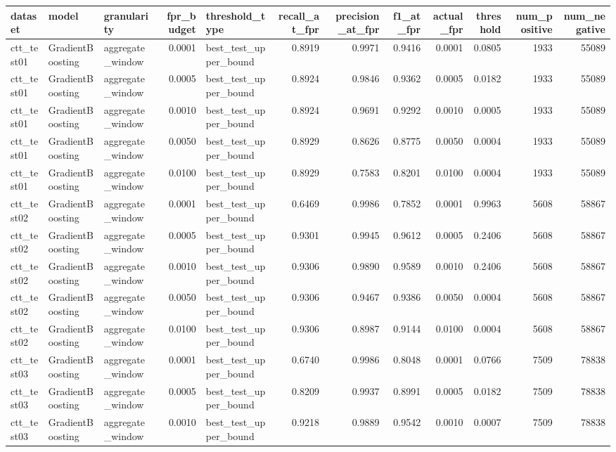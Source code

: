 \begin{tabular}{lllrlrrrrrrr}
\toprule
dataset & model & granularity & fpr\_budget & threshold\_type & recall\_at\_fpr & precision\_at\_fpr & f1\_at\_fpr & actual\_fpr & threshold & num\_positive & num\_negative \\
\midrule
ctt\_test01 & GradientBoosting & aggregate\_window & 0.0001 & best\_test\_upper\_bound & 0.8919 & 0.9971 & 0.9416 & 0.0001 & 0.0805 & 1933 & 55089 \\
ctt\_test01 & GradientBoosting & aggregate\_window & 0.0005 & best\_test\_upper\_bound & 0.8924 & 0.9846 & 0.9362 & 0.0005 & 0.0182 & 1933 & 55089 \\
ctt\_test01 & GradientBoosting & aggregate\_window & 0.0010 & best\_test\_upper\_bound & 0.8924 & 0.9691 & 0.9292 & 0.0010 & 0.0005 & 1933 & 55089 \\
ctt\_test01 & GradientBoosting & aggregate\_window & 0.0050 & best\_test\_upper\_bound & 0.8929 & 0.8626 & 0.8775 & 0.0050 & 0.0004 & 1933 & 55089 \\
ctt\_test01 & GradientBoosting & aggregate\_window & 0.0100 & best\_test\_upper\_bound & 0.8929 & 0.7583 & 0.8201 & 0.0100 & 0.0004 & 1933 & 55089 \\
ctt\_test02 & GradientBoosting & aggregate\_window & 0.0001 & best\_test\_upper\_bound & 0.6469 & 0.9986 & 0.7852 & 0.0001 & 0.9963 & 5608 & 58867 \\
ctt\_test02 & GradientBoosting & aggregate\_window & 0.0005 & best\_test\_upper\_bound & 0.9301 & 0.9945 & 0.9612 & 0.0005 & 0.2406 & 5608 & 58867 \\
ctt\_test02 & GradientBoosting & aggregate\_window & 0.0010 & best\_test\_upper\_bound & 0.9306 & 0.9890 & 0.9589 & 0.0010 & 0.2406 & 5608 & 58867 \\
ctt\_test02 & GradientBoosting & aggregate\_window & 0.0050 & best\_test\_upper\_bound & 0.9306 & 0.9467 & 0.9386 & 0.0050 & 0.0004 & 5608 & 58867 \\
ctt\_test02 & GradientBoosting & aggregate\_window & 0.0100 & best\_test\_upper\_bound & 0.9306 & 0.8987 & 0.9144 & 0.0100 & 0.0004 & 5608 & 58867 \\
ctt\_test03 & GradientBoosting & aggregate\_window & 0.0001 & best\_test\_upper\_bound & 0.6740 & 0.9986 & 0.8048 & 0.0001 & 0.0766 & 7509 & 78838 \\
ctt\_test03 & GradientBoosting & aggregate\_window & 0.0005 & best\_test\_upper\_bound & 0.8209 & 0.9937 & 0.8991 & 0.0005 & 0.0182 & 7509 & 78838 \\
ctt\_test03 & GradientBoosting & aggregate\_window & 0.0010 & best\_test\_upper\_bound & 0.9218 & 0.9889 & 0.9542 & 0.0010 & 0.0007 & 7509 & 78838 \\

\end{tabular}

